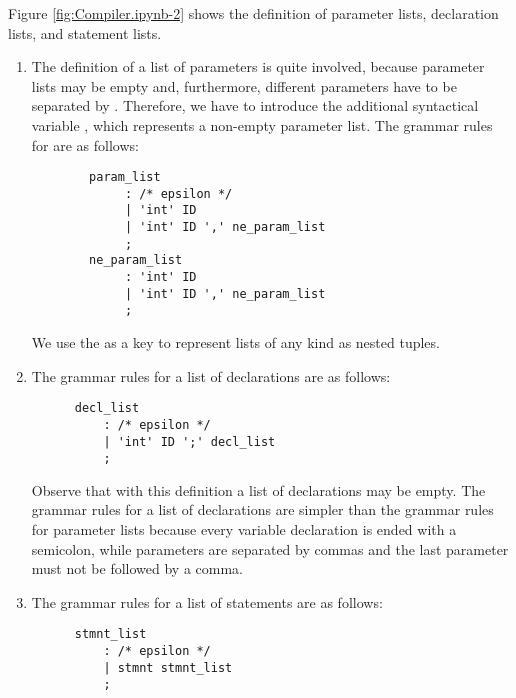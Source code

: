 Figure \ref{fig:Compiler.ipynb-2} shows the definition of parameter lists, declaration lists, and statement lists.
\begin{enumerate}
\item The definition of a list of parameters is quite involved, because parameter lists may be empty and,
      furthermore, different parameters have to be separated by \squoted{,}.  Therefore, we have to introduce 
      the additional syntactical variable , which represents a non-empty parameter
      list.  The grammar rules for  are as follows:
      \begin{verbatim}
        param_list 
             : /* epsilon */
             | 'int' ID
             | 'int' ID ',' ne_param_list
             ;
        ne_param_list 
             : 'int' ID
             | 'int' ID ',' ne_param_list
             ;
      \end{verbatim}
      We use the  as a key to represent lists of any kind as nested tuples.
\item The grammar rules for a list of declarations are as follows:
      \begin{verbatim}
      decl_list
          : /* epsilon */
          | 'int' ID ';' decl_list
          ;
      \end{verbatim}
      Observe that with this definition a list of declarations may be empty.
      The grammar rules for a list of declarations are simpler than the grammar rules for parameter lists
      because every variable declaration is ended with a semicolon, while parameters are separated by commas
      and the last parameter must not be followed by a comma.
\item The grammar rules for a list of statements are as follows:
      \begin{verbatim}
      stmnt_list
          : /* epsilon */
          | stmnt stmnt_list
          ;
      \end{verbatim}
\end{enumerate}
